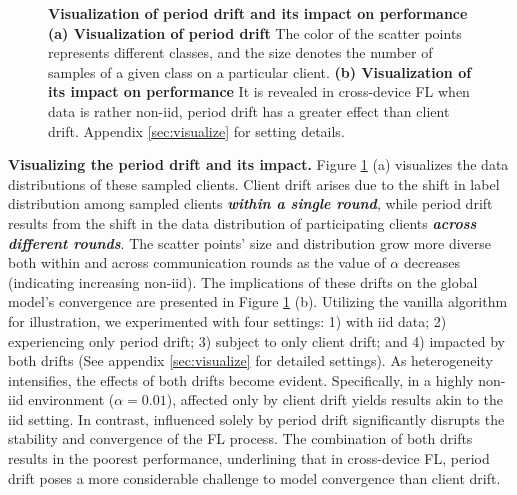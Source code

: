 \begin{figure}[hp]
  \centering
 \vspace{-3mm}

  \caption{
    \small \textbf{Visualization of period drift and its impact on performance} 
  \textbf{(a) Visualization of period drift} The color of the scatter points represents different classes, and the size denotes the number of samples of a given class on a particular client. 
  \textbf{(b) Visualization of its impact on performance} It is revealed in cross-device FL when data is rather non-iid, period drift has a greater effect than client drift. Appendix \ref{sec:visualize} for setting details.}
  \label{fig:visualize}
  
\end{figure}
\textbf{Visualizing the period drift and its impact.}
Figure \ref{fig:visualize} (a) visualizes the data distributions of these sampled clients. Client drift arises due to the shift in label distribution among sampled clients \textbf{\textit{within a single round}}, while period drift results from the shift in the data distribution of participating clients \textbf{\textit{across different rounds}}. The scatter points' size and distribution grow more diverse both within and across communication rounds as the value of $\alpha$ decreases (indicating increasing non-iid). The implications of these drifts on the global model's convergence are presented in Figure \ref{fig:visualize} (b). Utilizing the vanilla \fedavg algorithm for illustration, we experimented with four settings: 1) \fedavg with iid data; 2) \fedavg experiencing only period drift; 3) \fedavg subject to only client drift; and 4) \fedavg impacted by both drifts (See appendix \ref{sec:visualize} for detailed settings). As heterogeneity intensifies, the effects of both drifts become evident. Specifically, in a highly non-iid environment ($\alpha=0.01$), \fedavg affected only by client drift yields results akin to the iid setting. In contrast, \fedavg influenced solely by period drift significantly disrupts the stability and convergence of the FL process. The combination of both drifts results in the poorest performance, underlining that in cross-device FL, period drift poses a more considerable challenge to model convergence than client drift. 
